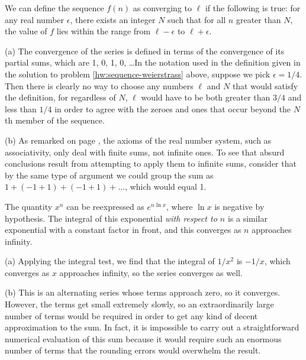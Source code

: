 

We can define the sequence $f(n)$ as converging to $\ell$
if the following is true: for any real number $\epsilon$, there exists an integer
$N$ such that for all $n$ greater than $N$,
the value of $f$ lies within the range from $\ell-\epsilon$ to $\ell+\epsilon$.


(a) The convergence of the series is defined in terms of the convergence of its partial sums,
which are 1, 0, 1, 0, \ldots In the notation used in the definition given in the solution to
problem \ref{hw:sequence-weierstrass} above, suppose we pick $\epsilon=1/4$. Then there is
clearly no way to choose any numbers $\ell$ and $N$ that would satisfy the definition,
for regardless of $N$, $\ell$ would have to be both greater than $3/4$ and less than $1/4$
in order to agree with the zeroes and ones that occur beyond the $N$th member of the sequence.

(b) As remarked on page \pageref{infinite-sum-warning}, the axioms of the real number system, such as
associativity, only deal with finite sums, not infinite ones. To see that absurd conclusions result
from attempting to apply them to infinite sums, consider that by the same type of argument we could group
the sum as $1+(-1+1)+(-1+1)+\ldots$, which would equal 1.


The quantity $x^n$ can be reexpressed as $e^{n\ln x}$, where $\ln x$ is negative by hypothesis.
The integral of this exponential \emph{with respect to $n$} is a similar exponential with a constant
factor in front, and this converges as $n$ approaches infinity.


(a) Applying the integral test, we find that the integral of $1/x^2$ is $-1/x$, which converges as $x$ approaches infinity, so the series
converges as well.

(b) This is an alternating series whose terms approach zero, so it converges. However, the terms get small extremely
slowly, so an extraordinarily large number of terms would be required in order to get any kind of decent approximation
to the sum. In fact, it is impossible to carry out a straightforward numerical evaluation of this sum because it would
require such an enormous number of terms that the rounding errors would overwhelm the result.

